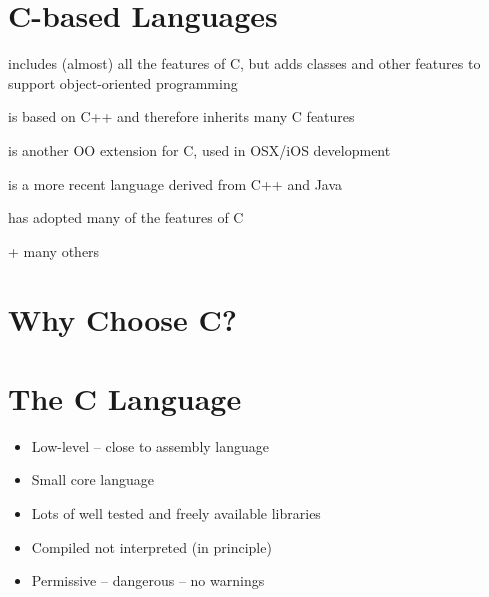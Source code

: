 \documentclass{article}
\begin{document}
\section{C-based Languages}
\begin{description}
\item[C++] includes (almost) all the features of C, but adds classes and other features to support object-oriented programming
\item[Java] is based on C++ and therefore inherits many C features
\item[Objective-C] is another OO extension for C, used in OSX/iOS development
\item[C\#] is a more recent language derived from   C++ and Java
\item[Perl] has adopted many of the features of C
\item + many others
\end{description}



\section{Why Choose C?}
\begin{center}
\end{center}



\section{The C Language}
\begin{itemize}
\item Low-level -- close to assembly language
\item Small core language
\item Lots of well tested and freely available libraries
\item Compiled not interpreted (in principle)
\item Permissive -- dangerous -- no warnings
\end{itemize}
\end{document}
